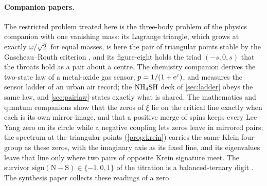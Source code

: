 \documentclass[11pt]{article}
\theoremstyle{definition}\newtheorem{definition}[theorem]{Definition}
\theoremstyle{remark}\newtheorem{remark}[theorem]{Remark}
\begin{document}
\paragraph{Companion papers.} The restricted problem treated here is the three-body problem of the physics companion \cite{SPhys} with one vanishing mass: its Lagrange triangle, which grows at exactly $\omega/\sqrt2$ for equal masses, is here the pair of triangular points stable by the Gascheau--Routh criterion \cite{Gascheau,Routh}, and its figure-eight holds the triad $(-s,0,s)$ that the throats hold as a pair about a centre. The chemistry companion \cite{SChem} derives the two-state law of a metal-oxide gas sensor, $p=1/(1+\mathrm e^{\varepsilon})$, and measures the sensor ladder of an urban air record; the $\mathrm{NH_4SH}$ deck of \cref{sec:ladder} obeys the same law, and \cref{sec:pairlaw} states exactly what is shared. The mathematics and quantum companions \cite{SMath,SQuant} show that the zeros of $\xi$ lie on the critical line exactly when each is its own mirror image, and that a positive merge of spins keeps every Lee--Yang zero on its circle while a negative coupling lets zeros leave in mirrored pairs; the spectrum at the triangular points (\cref{prop:krein}) carries the same Klein four-group as these zeros, with the imaginary axis as its fixed line, and its eigenvalues leave that line only where two pairs of opposite Krein signature meet. The survivor $\mathrm{sign}(\mathrm N-\mathrm S)\in\{-1,0,1\}$ of the titration is a balanced-ternary digit \cite{SAlg}. The synthesis paper \cite{SZero} collects these readings of a zero.
\end{document}
